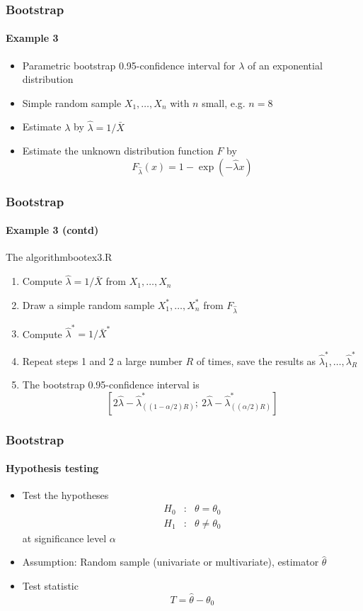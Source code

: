 \documentclass[smaller,compress]{beamer}
\begin{document}
\begin{frame}\frametitle{Bootstrap}\framesubtitle{Example 3}
\begin{itemize}
    \item Parametric bootstrap 0.95-confidence interval for $\lambda $ of an exponential distribution
    \item Simple random sample $X_{1},\ldots ,X_{n}$ with $n$ small, e.g. $n=8$
    \item Estimate $\lambda $ by $\hat{\lambda}=1/\bar{X}$
    \item Estimate the unknown distribution function $F$ by
    \begin{equation*}
    F_{\hat{\lambda}}(x)=1-\exp \left( -\hat{\lambda}x\right)
    \end{equation*}
\end{itemize}
\end{frame}


\begin{frame}\frametitle{Bootstrap}\framesubtitle{Example 3 (contd)}
The algorithm\hfill {\tiny bootex3.R}
\begin{enumerate}
    \item Compute $\hat{\lambda}=1/\bar{X}$ from $X_{1},\ldots ,X_{n}$
    \item Draw a simple random sample $X_{1}^{\ast },\ldots ,X_{n}^{\ast }$ from $F_{\hat{\lambda}}$
    \item Compute $\hat{\lambda}^{\ast }=1/\bar{X}^{\ast }$
    \item Repeat steps 1 and 2 a large number $R$ of times, save the results as $\hat{\lambda}_{1}^{\ast },\ldots ,\hat{\lambda}_{R}^{\ast }$
    \item The bootstrap 0.95-confidence interval is
    \begin{equation*}
    \left[ 2\hat{\lambda}-\hat{\lambda}_{(\left( 1-\alpha /2\right) R)}^{\ast};\ 2\hat{\lambda}-\hat{\lambda}_{((\alpha /2)R)}^{\ast }\right]
    \end{equation*}
\end{enumerate}
\end{frame}


\begin{frame}\frametitle{Bootstrap}\framesubtitle{Hypothesis testing}
\begin{itemize}
    \item Test the hypotheses
    \begin{eqnarray*}
    H_{0} &:&\theta =\theta _{0} \\
    H_{1} &:&\theta \neq \theta _{0}
    \end{eqnarray*}
    at significance level $\alpha $
    \item Assumption: Random sample (univariate or multivariate), estimator $\hat{\theta}$
    \item Test statistic
    \begin{equation*}
    T=\hat{\theta}-\theta _{0}
    \end{equation*}
\end{itemize}
\end{frame}
\end{document}
